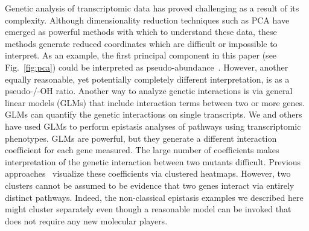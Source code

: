 %
%

Genetic analysis of transcriptomic data has proved challenging as a result of
its complexity. Although dimensionality reduction techniques such as PCA have
emerged as powerful methods with which to understand these data, these methods
generate reduced coordinates which are difficult or impossible to interpret. As
an example, the first principal component in this paper (see Fig.~\ref{fig:pca})
could be interpreted as \hifp{} pseudo-abundance~\citep{Lonnberg2017}. However,
another equally reasonable, yet potentially completely different interpretation,
is as a pseudo-\hifp{}/\hifp{}-OH ratio.
Another way to analyze genetic interactions is via general linear models (GLMs)
that include interaction terms between two or more genes. GLMs can quantify the
genetic interactions on single transcripts. We and others~\citep{Dixit2016,
Angeles-Albores2017a} have used GLMs to perform epistasis analyses of
pathways using transcriptomic phenotypes. GLMs are powerful, but
they generate a different interaction coefficient for each gene measured. The
large number of coefficients makes interpretation of the genetic interaction
between two mutants  difficult. Previous approaches~\citep{Dixit2016}
visualize these coefficients via clustered heatmaps. However, two clusters
cannot be assumed to be evidence that two genes interact via entirely distinct
pathways. Indeed, the non-classical epistasis examples we described here might
cluster separately even though a reasonable model can be invoked that does not
require any new molecular players.

